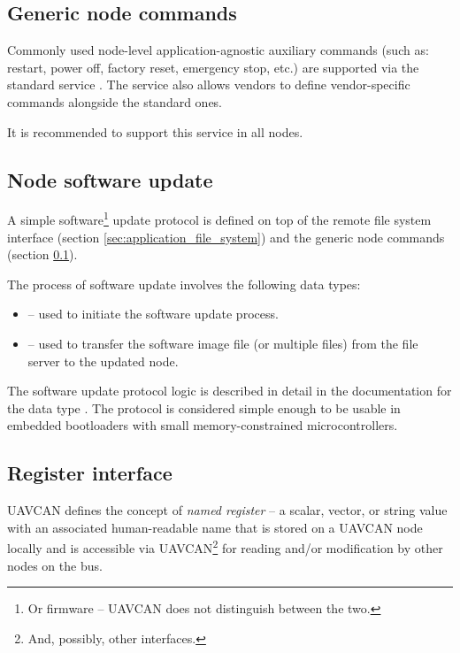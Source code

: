 
\subsection{Generic node commands}\label{sec:application_generic_node_commands}

Commonly used node-level application-agnostic auxiliary commands
(such as: restart, power off, factory reset, emergency stop, etc.)
are supported via the standard service .
The service also allows vendors to define vendor-specific commands alongside the standard ones.

It is recommended to support this service in all nodes.

\subsection{Node software update}

A simple software\footnote{Or firmware -- UAVCAN does not distinguish between the two.}
update protocol is defined on top of the remote file system interface (section \ref{sec:application_file_system})
and the generic node commands (section \ref{sec:application_generic_node_commands}).

The process of software update involves the following data types:

\begin{itemize}
    \item {} -- used to initiate the software update process.
    \item {} -- used to transfer the software image file (or multiple files)
          from the file server to the updated node.
\end{itemize}

The software update protocol logic is described in detail in the documentation for the data type
.
The protocol is considered simple enough to be usable in embedded bootloaders with
small memory-constrained microcontrollers.

\subsection{Register interface}\label{sec:application_register_interface}

UAVCAN defines the concept of \emph{named register} -- a scalar, vector, or string value with an associated
human-readable name that is stored on a UAVCAN node locally and is accessible via
UAVCAN\footnote{And, possibly, other interfaces.} for reading and/or modification
by other nodes on the bus.

